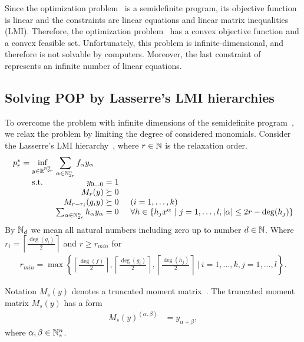 Since the optimization problem~ is a semidefinite program, its objective function is linear and the constraints are linear equations and linear matrix inequalities (LMI).
Therefore, the optimization problem~ has a convex objective function and a convex feasible set.
Unfortunately, this problem is infinite-dimensional, and therefore is not solvable by computers.
Moreover, the last constraint of~ represents an infinite number of linear equations.

\subsection{Solving POP by Lasserre's LMI hierarchies}
To overcome the problem with infinite dimensions of the semidefinite program~, we relax the problem by limiting the degree of considered monomials.
Consider the Lasserre's LMI hierarchy~, where $r\in\mathbb{N}$ is the relaxation order.
\begin{align}
  \arraycolsep=1.4pt
  \begin{array}{rclrcl@{\hskip0.5cm}l}
    p_r^* &=& \displaystyle \inf_{y\in\R^{\N^n_{2r}}} & \multicolumn{3}{l}{\displaystyle \sum_{\alpha\in\N^n_{2r}}{f}_\alpha y_\alpha} \\
    && \text{s.t.} & y_{0\ldots0} &=& 1\\
    &&& M_r(y) &\succeq& 0\\
    &&& M_{r-r_i}(g_iy) &\succeq& 0 & (i = 1,\ldots,k) \\
    &&& \sum_{\alpha\in\N^n_{2r}}h_\alpha y_\alpha &=& 0 & \forall h \in \{h_jx^\alpha\ |\ j = 1,\ldots,l, |\alpha|\leq 2r-\deg(h_j)\}
  \end{array}\labeleq{pol:lass:sdpr}
\end{align}
By $\mathbb{N}_d$ we mean all natural numbers including zero up to number $d\in\mathbb{N}$.
Where $r_i = \left\lceil\frac{\deg(g_i)}{2}\right\rceil$ and $r \geq r_{min}$ for
\begin{align}
  r_{min} = \max\left\{\left\lceil\frac{\deg(f)}{2}\right\rceil, \left\lceil\frac{\deg(g_i)}{2}\right\rceil, \left\lceil\frac{\deg(h_j)}{2}\right\rceil\ |\ i = 1,\ldots, k, j = 1, \ldots, l\right\}.
\end{align}

Notation $M_s(y)$ denotes a truncated moment matrix~\cite[page 53]{SOS}.
The truncated moment matrix $M_s(y)$ has a form
\begin{align}
  M_s(y)^{(\alpha,\beta)} &= y_{\alpha+\beta},
\end{align}
where $\alpha, \beta\in\mathbb{N}^n_s$.

